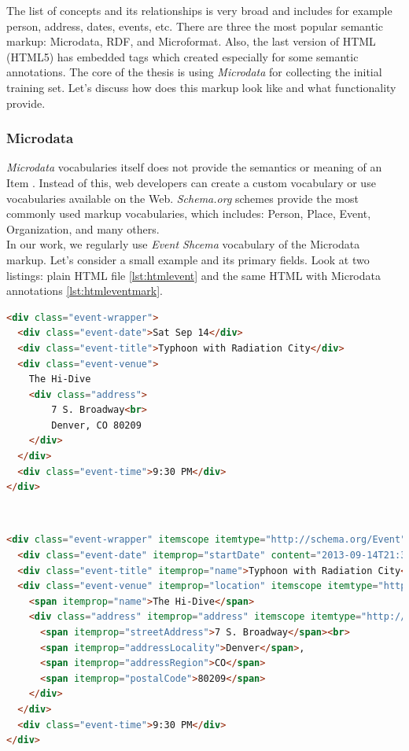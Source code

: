 The list of concepts and its relationships is very broad and includes for example person, address, dates, events, etc. There are three the most popular semantic markup: Microdata, RDF, and Microformat. Also, the last version of HTML (HTML5) has embedded tags which created especially for some semantic annotations. The core of the thesis is using \textit{Microdata} for collecting the initial training set. Let's discuss how does this markup look like and what functionality provide.\\

\subsubsection*{Microdata}
\label{subsubsec:microdata}
\textit{Microdata} vocabularies itself does not provide the semantics or meaning of an Item \cite{Microdata}. Instead of this, web developers can create a custom vocabulary or use vocabularies available on the Web. \textit{Schema.org} schemes provide the most commonly used markup vocabularies, which includes: Person, Place, Event, Organization, and many others. \\

In our work, we regularly use \textit{Event Shcema} vocabulary of the Microdata markup. Let's consider a small example and its primary fields. Look at two listings: plain HTML file \ref{lst:htmlevent} and the same HTML with Microdata annotations \ref{lst:htmleventmark}.\\

\begin{lstlisting}[language=html, caption={Event information without semantic markup}, label={lst:htmlevent}, captionpos=b]
<div class="event-wrapper">
  <div class="event-date">Sat Sep 14</div>
  <div class="event-title">Typhoon with Radiation City</div>
  <div class="event-venue">
    The Hi-Dive
    <div class="address">
        7 S. Broadway<br>
        Denver, CO 80209
    </div>
  </div>
  <div class="event-time">9:30 PM</div>
</div>

\end{lstlisting}
\\

\begin{lstlisting}[language=html, caption={Event information annotated with Microdata}, label={lst:htmleventmark}, captionpos=b]
<div class="event-wrapper" itemscope itemtype="http://schema.org/Event">
  <div class="event-date" itemprop="startDate" content="2013-09-14T21:30">Sat Sep 14</div>
  <div class="event-title" itemprop="name">Typhoon with Radiation City</div>
  <div class="event-venue" itemprop="location" itemscope itemtype="http://schema.org/Place">
    <span itemprop="name">The Hi-Dive</span>
    <div class="address" itemprop="address" itemscope itemtype="http://schema.org/PostalAddress">
      <span itemprop="streetAddress">7 S. Broadway</span><br>
      <span itemprop="addressLocality">Denver</span>,
      <span itemprop="addressRegion">CO</span>
      <span itemprop="postalCode">80209</span>
    </div>
  </div>
  <div class="event-time">9:30 PM</div>
</div>

\end{lstlisting}\\


